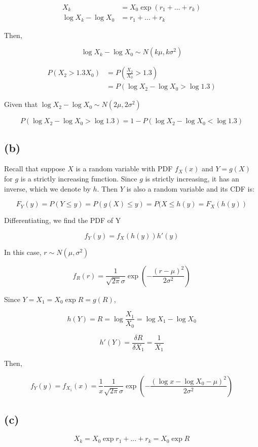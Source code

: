 \documentclass[11pt]{scrartcl}
\begin{document}
\begin{align*}
X_k &= X_0 \exp{(r_1 + ... + r_k)} \\
\log {X_k} - \log{X_0} &= r_1 + ... + r_k
\end{align*}

Then,

\[\log{X_k} - \log{X_0} \sim N(k\mu, k\sigma^2)\]

\begin{align*}
P(X_2 > 1.3X_0) &= P\left(\frac{X_2}{X_0} > 1.3 \right) \\
&= P\left( \log{X_2} - \log{X_0} > \log{1.3}\right)
\end{align*}

Given that $\log{X_2} - \log{X_0} \sim N(2\mu, 2\sigma^2)$

\[P\left( \log{X_2} - \log{X_0} > \log{1.3}\right) = 1 - P\left( \log{X_2} - \log{X_0} < \log{1.3}\right)\]

\subsection*{(b)}
Recall that suppose $X$ is a random variable with PDF $f_X(x)$ and $Y = g(X)$ for $g$ is a strictly increasing function. Since $g$ is strictly increasing, it has an inverse, which we denote by $h$. Then $Y$ is also a random variable and its CDF is:

\[F_Y(y) = P(Y \leq y) = P(g(X) \leq y) = P(X \leq h(y) = F_X (h(y))\]

Differentiating, we find the PDF of Y

\[f_Y(y) = f_X(h(y)) h'(y)\]

In this case, $r \sim N(\mu, \sigma^2)$

\[f_R(r) = \frac{1}{\sqrt{2\pi}\sigma}\exp{\left(-\frac{(r-\mu)^2}{2\sigma^2}\right)}\]

Since $Y = X_1 = X_0 \exp{R} = g(R)$,

\[h(Y) = R = \log{\frac{X_1}{X_0}} = \log{X_1} - \log{X_0}\]

\[h'(Y) = \frac{\delta R}{\delta X_1} = \frac{1}{X_1}\]

Then,

\[f_Y(y) = f_{X_1}(x) = \frac{1}{x}\frac{1}{\sqrt{2\pi}\sigma} \exp{\left(- \frac{(\log{x} - \log{X_0} - \mu)^2}{2\sigma^2}\right)}\]

\subsection*{(c)}
\[X_k = X_0 \exp{r_1 + ... + r_k} = X_0\exp{R}\]
\end{document}

